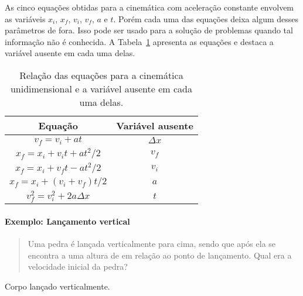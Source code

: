 As cinco equações obtidas para a cinemática com aceleração constante envolvem as variáveis $x_i$, $x_f$, $v_i$, $v_f$, $a$ e $t$. Porém cada uma das equações deixa algum desses parâmetros de fora. Isso pode ser usado para a solução de problemas quando tal informação não é conhecida. A Tabela~\ref{Tab:EqsCinematicasVarAusentes} apresenta as equações e destaca a variável ausente em cada uma delas.
\begin{table}[!h]
\centering
\begin{tabular}{cc}
\toprule
Equação & Variável ausente\\
\midrule
$v_f = v_i + at$ & $\Delta x$ \\
$x_f = x_i + v_i t + at^2 / 2$ & $v_f$ \\
$x_f = x_i + v_f t - at^2 / 2$ & $v_i$ \\
$x_f = x_i + (v_i + v_f) t / 2$ & $a$ \\
$v_f^2 = v_i^2 + 2 a \Delta x$ & $t$ \\
\bottomrule
\end{tabular}
\caption{Relação das equações para a cinemática unidimensional e a variável ausente em cada uma delas. \label{Tab:EqsCinematicasVarAusentes}}
\end{table}

\paragraph{Exemplo: Lançamento vertical}

\begin{quote}
    Uma pedra é lançada verticalmente para cima, sendo que após  ela se encontra a uma altura de  em relação ao ponto de lançamento. Qual era a velocidade inicial da pedra?
\end{quote}

\begin{marginfigure}
\centering
{}
\caption{Corpo lançado verticalmente.}
\end{marginfigure}

